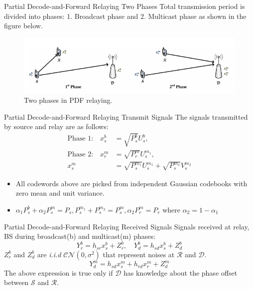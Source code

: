 \documentclass{beamer}
\begin{document}
\begin{frame}{Partial Decode-and-Forward Relaying} {Two Phases}
Total transmission period is divided into phases: 1. Broadcast phase and 2. Multicast phase as shown in the figure below.
\begin{figure}
\centering
\includegraphics[width=\textwidth]{figures/pdfRelaying.png}
  \caption{Two phases in PDF relaying.}
\end{figure}
\end{frame}

\begin{frame}{Partial Decode-and-Forward Relaying} {Transmit Signals}
\vspace{-1cm}
The signals transmitted by source and relay are as follows:
\begin{align*}
\text{Phase 1:}\quad x^b_s &= \sqrt{P_s^b} U_s^b, \\
\text{Phase 2:}\quad x_r^m &= \sqrt{P_r^m}U_s^{m_1}, \\ 
 x^m_s &= \sqrt{P_s^{m_1}}U_s^{m_1} + \sqrt{P_s^{m_2}}V_s^{m_2} 
\end{align*}
\vspace{-0.5cm}
\begin{itemize}
\item All codewords above are picked from independent Gaussian codebooks with zero mean and unit variance.
\item $\alpha_1 P_s^b + \alpha_2 P_s^m = P_s, P_s^{m_1}+P_s^{m_2} = P_s^m,  \alpha_2P_r^m = P_r$
where $\alpha_2 = 1-\alpha_1$
\end{itemize}
\end{frame}

\begin{frame}{Partial Decode-and-Forward Relaying} {Received Signals}
\vspace{-1cm}
Signals received at relay, BS during broadcast(b) and multicast(m) phases:
\begin{equation*}
Y_r^b = h_{sr}x^b_s + Z_r^b , \quad Y_d^b = h_{sd}x^b_s + Z_d^b
\end{equation*}
$Z_r^b$ and $Z_d^b$ are \textit{i.i.d} $\mathcal{CN}(0,\sigma^2)$ that represent noises at $\mathcal{R}$ and $\mathcal{D}$. \\
\pause
\begin{equation*}
Y_d^m = h_{sd}x^m_s + h_{rd}x_r^m + Z_d^m
\end{equation*}
The above expression is true only if $\mathcal{D}$ has knowledge about the phase offset between $\mathcal{S}$ and $\mathcal{R}$. 
\end{frame}
\end{document}

